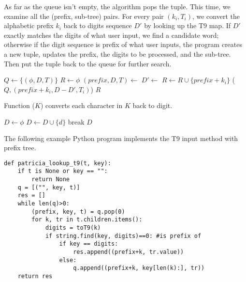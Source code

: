 \documentclass{article}
\begin{document}
As far as the queue isn't empty, the algorithm pops the
tuple. This time, we examine all the (prefix, sub-tree) pairs. For every pair
$(k_i, T_i)$, we convert the alphabetic prefix $k_i$ back to digits sequence $D'$
by looking up the T9 map. If $D'$ exactly matches the digits of what user input,
we find a candidate word; otherwise if the digit sequence is prefix of what user inputs,
the program creates a new tuple, updates the prefix, the digits to be processed,
and the sub-tree. Then put the tuple back to the queue for further search.

\begin{algorithmic}[1]
  \State $Q \gets \{(\phi, D, T)\}$
  \State $R \gets \phi$
    \State $(prefix, D, T) \gets$ 
      \State $D' \gets$ 
       
          \State $R \gets R \cup \{prefix + k_i\}$
        \Else
          \State {}($Q, (prefix + k_i, D - D', T_i)$)
        \EndIf
      \EndIf
    \EndFor
  \EndWhile
  \State \Return $R$
\EndFunction
\end{algorithmic}

Function ($K$) converts each character in $K$ back to digit.

\begin{algorithmic}[1]
  \State $D \gets \phi$
         \State $D \gets D \cup \{d\}$
         \State break
       \EndIf
     \EndFor
  \EndFor
  \State \Return $D$
\EndFunction
\end{algorithmic}

The following example Python program implements the T9 input method with prefix tree.

\lstset{language=Python}
\begin{lstlisting}
def patricia_lookup_t9(t, key):
    if t is None or key == "":
        return None
    q = [("", key, t)]
    res = []
    while len(q)>0:
        (prefix, key, t) = q.pop(0)
        for k, tr in t.children.items():
            digits = toT9(k)
            if string.find(key, digits)==0: #is prefix of
                if key == digits:
                    res.append((prefix+k, tr.value))
                else:
                    q.append((prefix+k, key[len(k):], tr))
    return res
\end{lstlisting}
\end{document}
